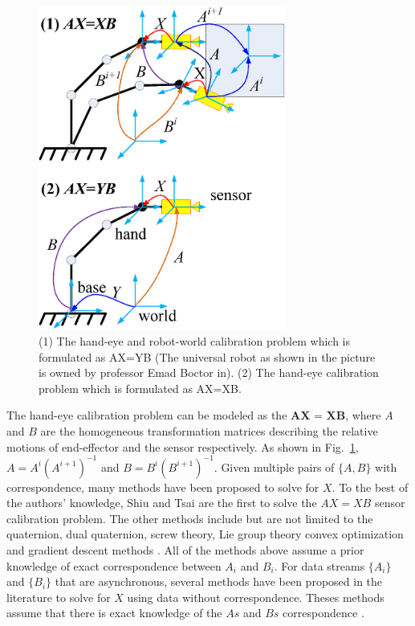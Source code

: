 \documentclass[letterpaper, 10 pt, conference]{ieeeconf}  %
\begin{document}
\begin{center}
\begin{figure}[htbp]
\centering
\includegraphics[width=3.2in]{fig1.eps}
\caption{
(1) The hand-eye and robot-world calibration problem which is formulated as AX=YB (The universal robot as shown in the picture is owned by professor Emad Boctor in). (2) The hand-eye calibration problem which is formulated as AX=XB.
}
\label{fig1}
\end{figure}
\end{center}
The hand-eye calibration problem can be modeled as the $\textbf{AX = XB}$, where $A$ and $B$ are the homogeneous transformation matrices describing  the relative motions of end-effector and the  sensor respectively. As shown in Fig.~\ref{fig1}, $A = A^{i}(A^{i+1})^{-1}$ and  $B = B^{i}(B^{i+1})^{-1}$. Given multiple pairs of $\{A,B \}$ with correspondence, many methods have been proposed to solve for $X$. To the best of the authors' knowledge, Shiu \cite{Shiu1989} and Tsai \cite{Tsai1989} are the first to solve the $AX = XB$ sensor calibration problem. The other methods include but are not limited to the quaternion, dual quaternion, screw theory, Lie group theory convex optimization and gradient descent methods \cite{Wang1992,Park1994,Horaud1995,Daniilidis1999,Fassi2005,Zhao2011,Ackerman2014a}. All of the methods above assume a prior knowledge of exact correspondence between $A_i$ and $B_i$. For data streams $\{A_i\}$ and $\{B_i\}$ that are asynchronous, several methods have been proposed in the literature to solve for $X$ using data without correspondence.  Theses methods assume that there is exact knowledge of the $As$ and $Bs$ correspondence \cite{Ackerman2013a,Ackerman2013,Ackerman2014}.
\end{document}
